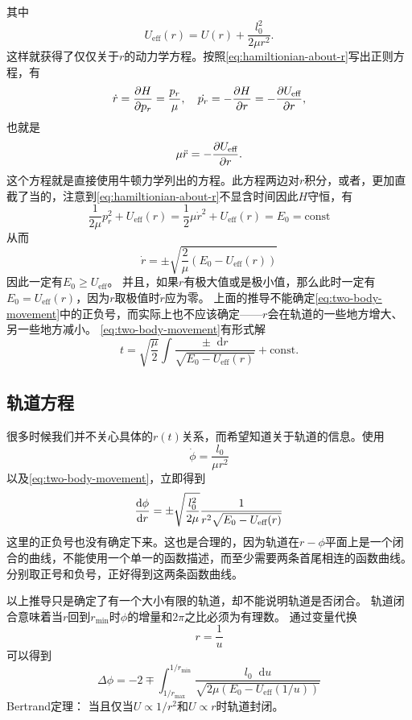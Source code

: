 \documentclass[UTF8, a4paper]{ctexart}
\renewcommand*{\dd}{\mathop{}\!\mathrm{d}}
\newcommand*{\const}{\mathrm{const}}
\begin{document}
其中
\begin{equation}
    U_\text{eff} (r) = U(r) + \frac{l_0^2}{2\mu r^2}.
\end{equation}
这样就获得了仅仅关于$r$的动力学方程。按照\eqref{eq:hamiltionian-about-r}写出正则方程，有
\[
    \dot{r} = \pdv{H}{p_r} = \frac{p_r}{\mu}, \quad \dot{p_r} = - \pdv{H}{r} = - \pdv{U_\text{eff}}{r},
\]
也就是
\[
    \mu \ddot{r} = - \pdv{U_\text{eff}}{r}.
\]
这个方程就是直接使用牛顿力学列出的方程。此方程两边对$r$积分，或者，更加直截了当的，注意到\eqref{eq:hamiltionian-about-r}不显含时间因此$H$守恒，有
\[
    \frac{1}{2 \mu} p_r^2 + U_\text{eff}(r) = \frac{1}{2} \mu \dot{r}^2 + U_\text{eff}(r) = E_0 = \const
\]
从而
\begin{equation}
    \dot{r} = \pm \sqrt{\frac{2}{\mu} (E_0 - U_\text{eff}(r))}
    \label{eq:two-body-movement}
\end{equation}
因此一定有$E_0 \geq U_\text{eff}$。
并且，如果$r$有极大值或是极小值，那么此时一定有$E_0 = U_\text{eff}(r)$，因为$r$取极值时$\dot{r}$应为零。
上面的推导不能确定\eqref{eq:two-body-movement}中的正负号，而实际上也不应该确定——$r$会在轨道的一些地方增大、另一些地方减小。
\eqref{eq:two-body-movement}有形式解
\begin{equation}
    t = \sqrt{\frac{\mu}{2}} \int \frac{\pm \dd r}{\sqrt{E_0 - U_\text{eff}(r)}} + \const.
\end{equation}

\subsection{轨道方程}

很多时候我们并不关心具体的$r(t)$关系，而希望知道关于轨道的信息。使用
\[
    \dot{\phi} = \frac{l_0}{\mu r^2}
\]
以及\eqref{eq:two-body-movement}，立即得到
\begin{equation}
    \dv{\phi}{r} = \pm \sqrt{\frac{l_0^2}{2\mu}} \frac{1}{r^2 \sqrt{E_0 - U_\text{eff}(r)}}
    \label{eq:two-body-orbit}
\end{equation}
这里的正负号也没有确定下来。这也是合理的，因为轨道在$r-\phi$平面上是一个闭合的曲线，不能使用一个单一的函数描述，而至少需要两条首尾相连的函数曲线。分别取正号和负号，正好得到这两条函数曲线。

以上推导只是确定了有一个大小有限的轨道，却不能说明轨道是否闭合。
轨道闭合意味着当$r$回到$r_\text{min}$时$\phi$的增量和$2\pi$之比必须为有理数。
通过变量代换
\begin{equation}
    r = \frac{1}{u}
\end{equation}
可以得到
\[
    \Delta \phi = - 2 \mp \int_{1/r_\text{max}}^{1/r_\text{min}} \frac{l_0 \dd u}{\sqrt{2\mu (E_0 - U_\text{eff}(1/u))}}
\]
Bertrand定理：
当且仅当$U \propto 1/r^2$和$U \propto r$时轨道封闭。
\end{document}

